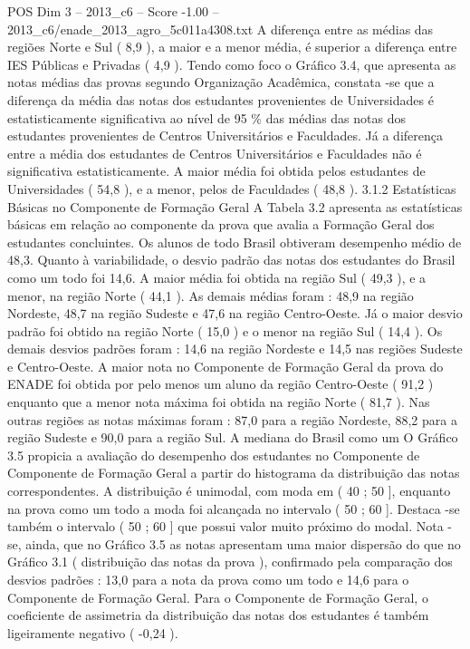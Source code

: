 \begin{textsample}{POS Dim 3 – 2013\_c6 – Score -1.00 – 2013\_c6/enade\_2013\_agro\_5c011a4308.txt}
A diferença entre as médias das regiões Norte e Sul ( 8,9 ), a maior e a menor média, é superior a diferença entre IES Públicas e Privadas ( 4,9 ).
Tendo como foco o Gráfico 3.4, que apresenta as notas médias das provas segundo Organização Acadêmica, constata -se que a diferença da média das notas dos estudantes provenientes de Universidades é estatisticamente significativa ao nível de 95 \% das médias das notas dos estudantes provenientes de Centros Universitários e Faculdades.
Já a diferença entre a média dos estudantes de Centros Universitários e Faculdades não é significativa estatisticamente.
A maior média foi obtida pelos estudantes de Universidades ( 54,8 ), e a menor, pelos de Faculdades ( 48,8 ). 3.1.2 Estatísticas Básicas no Componente de Formação Geral A Tabela 3.2 apresenta as estatísticas básicas em relação ao componente da prova que avalia a Formação Geral dos estudantes concluintes.
Os alunos de todo Brasil obtiveram desempenho médio de 48,3.
Quanto à variabilidade, o desvio padrão das notas dos estudantes do Brasil como um todo foi 14,6.
A maior média foi obtida na região Sul ( 49,3 ), e a menor, na região Norte ( 44,1 ).
As demais médias foram : 48,9 na região Nordeste, 48,7 na região Sudeste e 47,6 na região Centro-Oeste.
Já o maior desvio padrão foi obtido na região Norte ( 15,0 ) e o menor na região Sul ( 14,4 ).
Os demais desvios padrões foram : 14,6 na região Nordeste e 14,5 nas regiões Sudeste e Centro-Oeste.
A maior nota no Componente de Formação Geral da prova do ENADE foi obtida por pelo menos um aluno da região Centro-Oeste ( 91,2 ) enquanto que a menor nota máxima foi obtida na região Norte ( 81,7 ).
Nas outras regiões as notas máximas foram : 87,0 para a região Nordeste, 88,2 para a região Sudeste e 90,0 para a região Sul.
A mediana do Brasil como um O Gráfico 3.5 propicia a avaliação do desempenho dos estudantes no Componente de Componente de Formação Geral a partir do histograma da distribuição das notas correspondentes.
A distribuição é unimodal, com moda em ( 40 ; 50 ], enquanto na prova como um todo a moda foi alcançada no intervalo ( 50 ; 60 ].
Destaca -se também o intervalo ( 50 ; 60 ] que possui valor muito próximo do modal.
Nota -se, ainda, que no Gráfico 3.5 as notas apresentam uma maior dispersão do que no Gráfico 3.1 ( distribuição das notas da prova ), confirmado pela comparação dos desvios padrões : 13,0 para a nota da prova como um todo e 14,6 para o Componente de Formação Geral.
Para o Componente de Formação Geral, o coeficiente de assimetria da distribuição das notas dos estudantes é também ligeiramente negativo ( -0,24 ).

\end{textsample}
